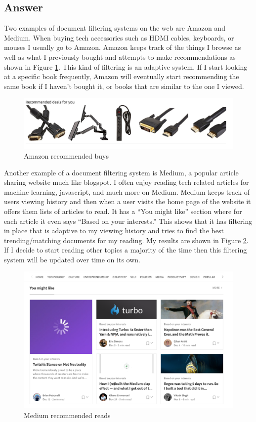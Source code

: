\documentclass[letterpaper,11pt]{article}
\begin{document}
\subsection*{Answer}

Two examples of document filtering systems on the web are Amazon and Medium.
When buying tech accessories such as HDMI cables, keyboards, or mouses I usually go to Amazon.
Amazon keeps track of the things I browse as well as what I previously bought and attempts to make recommendations as shown in Figure \ref{fig:ama}.
This kind of filtering is an adaptive system.
If I start looking at a specific book frequently, Amazon will eventually start recommending the same book if I haven't bought it, or books that are similar to the one I viewed.

\begin{figure}[h]
\centering
\includegraphics[scale=0.4]{amazon.png}
\caption{Amazon recommended buys}
\label{fig:ama}
\end{figure}

Another example of a document filtering system is Medium, a popular article sharing website much like blogspot.
I often enjoy reading tech related articles for machine learning, javascript, and much more on Medium.
Medium keeps track of users viewing history and then when a user visits the home page of the website it offers them lists of articles to read.
It has a ``You might like'' section where for each article it even says ``Based on your interests.''
This shows that it has filtering in place that is adaptive to my viewing history and tries to find the best trending/matching documents for my reading.
My results are shown in Figure \ref{fig:med}.
If I decide to start reading other topics a majority of the time then this filtering system will be updated over time on its own.

\begin{figure}[h]
\centering
\includegraphics[scale=0.4]{medium.png}
\caption{Medium recommended reads}
\label{fig:med}
\end{figure}
\end{document}
